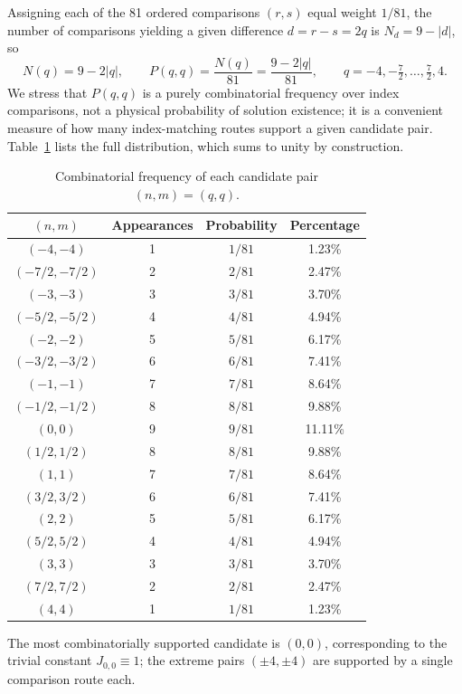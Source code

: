 \documentclass[11pt]{article}
\begin{document}
Assigning each of the 81 ordered comparisons $(r,s)$ equal weight $1/81$, the number of
comparisons yielding a given difference $d=r-s=2q$ is $N_d=9-|d|$, so
\begin{equation}
N(q)=9-2|q|, \qquad P(q,q)=\frac{N(q)}{81}=\frac{9-2|q|}{81},
\qquad q=-4,-\tfrac72,\dots,\tfrac72,4.
\label{eq:prob}
\end{equation}
We stress that $P(q,q)$ is a purely combinatorial frequency over index comparisons, not a
physical probability of solution existence; it is a convenient measure of how many
index-matching routes support a given candidate pair. Table~\ref{tab:freq} lists the full
distribution, which sums to unity by construction.

\begin{table}[htbp]
\centering
\caption{Combinatorial frequency of each candidate pair $(n,m)=(q,q)$.}
\label{tab:freq}
\begin{tabular}{cccc}
\toprule
$(n,m)$ & Appearances & Probability & Percentage \\
\midrule
$(-4,-4)$ & 1 & $1/81$ & 1.23\% \\
$(-7/2,-7/2)$ & 2 & $2/81$ & 2.47\% \\
$(-3,-3)$ & 3 & $3/81$ & 3.70\% \\
$(-5/2,-5/2)$ & 4 & $4/81$ & 4.94\% \\
$(-2,-2)$ & 5 & $5/81$ & 6.17\% \\
$(-3/2,-3/2)$ & 6 & $6/81$ & 7.41\% \\
$(-1,-1)$ & 7 & $7/81$ & 8.64\% \\
$(-1/2,-1/2)$ & 8 & $8/81$ & 9.88\% \\
$(0,0)$ & 9 & $9/81$ & 11.11\% \\
$(1/2,1/2)$ & 8 & $8/81$ & 9.88\% \\
$(1,1)$ & 7 & $7/81$ & 8.64\% \\
$(3/2,3/2)$ & 6 & $6/81$ & 7.41\% \\
$(2,2)$ & 5 & $5/81$ & 6.17\% \\
$(5/2,5/2)$ & 4 & $4/81$ & 4.94\% \\
$(3,3)$ & 3 & $3/81$ & 3.70\% \\
$(7/2,7/2)$ & 2 & $2/81$ & 2.47\% \\
$(4,4)$ & 1 & $1/81$ & 1.23\% \\
\bottomrule
\end{tabular}
\end{table}

The most combinatorially supported candidate is $(0,0)$, corresponding to the trivial
constant $J_{0,0}\equiv1$; the extreme pairs $(\pm4,\pm4)$ are supported by a single
comparison route each.
\end{document}
